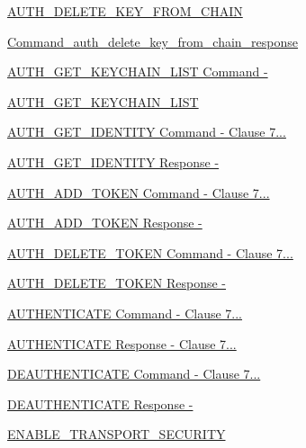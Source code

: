 \begin{DoxyCompactItemize}
\item 
\hyperlink{group__command__auth__delete__key__from__chain}{A\+U\+T\+H\+\_\+\+D\+E\+L\+E\+T\+E\+\_\+\+K\+E\+Y\+\_\+\+F\+R\+O\+M\+\_\+\+C\+H\+A\+IN}
\item 
\hyperlink{group__command__auth__delete__key__from__chain__response}{Command\+\_\+auth\+\_\+delete\+\_\+key\+\_\+from\+\_\+chain\+\_\+response}
\item 
\hyperlink{group__command__auth__get__keychain__list}{A\+U\+T\+H\+\_\+\+G\+E\+T\+\_\+\+K\+E\+Y\+C\+H\+A\+I\+N\+\_\+\+L\+I\+S\+T Command  -\/}
\item 
\hyperlink{group__command__auth__get__keychain__list__response}{A\+U\+T\+H\+\_\+\+G\+E\+T\+\_\+\+K\+E\+Y\+C\+H\+A\+I\+N\+\_\+\+L\+I\+ST}
\item 
\hyperlink{group__command__auth__get__identity}{A\+U\+T\+H\+\_\+\+G\+E\+T\+\_\+\+I\+D\+E\+N\+T\+I\+T\+Y Command  -\/ Clause 7...}
\item 
\hyperlink{group__command__auth__get__identity__response}{A\+U\+T\+H\+\_\+\+G\+E\+T\+\_\+\+I\+D\+E\+N\+T\+I\+T\+Y Response  -\/}
\item 
\hyperlink{group__command__auth__add__token}{A\+U\+T\+H\+\_\+\+A\+D\+D\+\_\+\+T\+O\+K\+E\+N Command  -\/ Clause 7...}
\item 
\hyperlink{group__command__auth__add__token__response}{A\+U\+T\+H\+\_\+\+A\+D\+D\+\_\+\+T\+O\+K\+E\+N Response  -\/}
\item 
\hyperlink{group__command__auth__delete__token}{A\+U\+T\+H\+\_\+\+D\+E\+L\+E\+T\+E\+\_\+\+T\+O\+K\+E\+N Command  -\/ Clause 7...}
\item 
\hyperlink{group__command__auth__delete__token__response}{A\+U\+T\+H\+\_\+\+D\+E\+L\+E\+T\+E\+\_\+\+T\+O\+K\+E\+N Response  -\/}
\item 
\hyperlink{group__command__authenticate}{A\+U\+T\+H\+E\+N\+T\+I\+C\+A\+T\+E Command  -\/ Clause 7...}
\item 
\hyperlink{group__command__authenticate__response}{A\+U\+T\+H\+E\+N\+T\+I\+C\+A\+T\+E Response  -\/ Clause 7...}
\item 
\hyperlink{group__command__deauthenticate}{D\+E\+A\+U\+T\+H\+E\+N\+T\+I\+C\+A\+T\+E Command  -\/ Clause 7...}
\item 
\hyperlink{group__command__deauthenticate__response}{D\+E\+A\+U\+T\+H\+E\+N\+T\+I\+C\+A\+T\+E Response  -\/}
\item 
\hyperlink{group__command__enable__transport__security}{E\+N\+A\+B\+L\+E\+\_\+\+T\+R\+A\+N\+S\+P\+O\+R\+T\+\_\+\+S\+E\+C\+U\+R\+I\+TY}

\end{DoxyCompactItemize}
